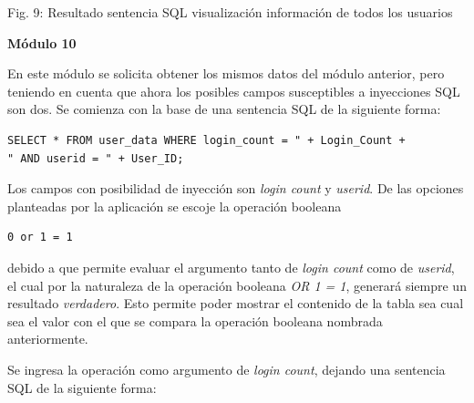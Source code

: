 \documentclass[12pt,oneside,a4paper]{book}
\begin{document}
\begin{enumerate}
\begin{enumerate}
\begin{center}
            \vspace{0.1em}
            
            Fig. 9: Resultado sentencia SQL visualización información de todos los usuarios
        \end{center}
        
        \newpage

        \textbf{Módulo 10}
        
        \vspace{1em}

        \hspace{20pt}
        En este módulo se solicita obtener los mismos datos del módulo anterior, pero teniendo en cuenta que ahora los posibles campos susceptibles a inyecciones SQL son dos. Se comienza con la base de una sentencia SQL de la siguiente forma:

        \vspace{1em}
        
        \begin{verbatim}
SELECT * FROM user_data WHERE login_count = " + Login_Count +
" AND userid = " + User_ID;
        \end{verbatim}
        
        \hspace{20pt}
        Los campos con posibilidad de inyección son \textit{login count} y \textit{userid}. De las opciones planteadas por la aplicación se escoje la operación booleana

        \vspace{1em}
        
        \begin{verbatim}
0 or 1 = 1
        \end{verbatim}

        debido a que permite evaluar el argumento tanto de \textit{login count} como de \textit{userid}, el cual por la naturaleza de la operación booleana \textit{ OR 1 = 1}, generará siempre un resultado \textit{verdadero}. Esto permite poder mostrar el contenido de la tabla sea cual sea el valor con el que se compara la operación booleana nombrada anteriormente.

        \vspace{1em}
        
        \hspace{20pt}
        Se ingresa la operación como argumento de \textit{login count}, dejando una sentencia SQL de la siguiente forma:


\end{enumerate}
\end{enumerate}
\end{document}
